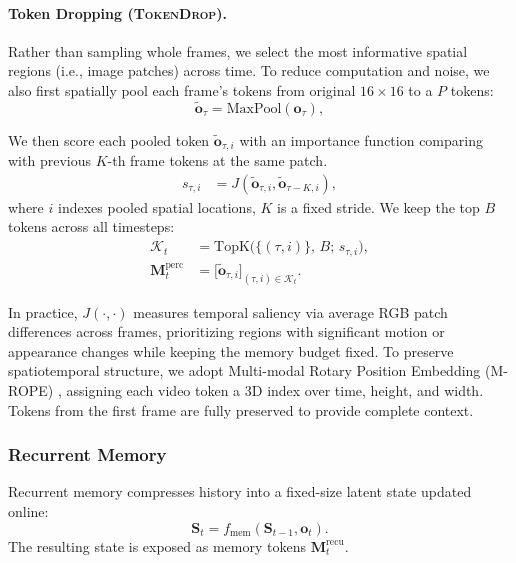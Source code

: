 \paragraph{Token Dropping (\textsc{TokenDrop}).}
Rather than sampling whole frames, we select the most informative spatial regions (i.e., image patches) across time.
To reduce computation and noise, we also first spatially pool each frame's tokens from original $16{\times}16$ to a $P$ tokens:
\[
\tilde{\mathbf{o}}_\tau = \mathrm{MaxPool}(\mathbf{o}_\tau),
\]


We then score each pooled token $\tilde{\mathbf{o}}_{\tau,i}$ with an importance function comparing with previous $K$-th frame tokens at the same patch.
\begin{align}
s_{\tau,i} &= J(\tilde{\mathbf{o}}_{\tau,i}, \tilde{\mathbf{o}}_{\tau-K,i}),
\end{align}
where $i$ indexes pooled spatial locations, $K$ is a fixed stride.
We keep the top $B$ tokens across all timesteps:
\begin{align}
\mathcal{K}_t
&= \mathrm{TopK}\Big(\{(\tau,i)\},\, B;\, s_{\tau,i}\Big),\\
\mathbf{M}_t^{\text{perc}}
&= \big[\tilde{\mathbf{o}}_{\tau,i}\big]_{(\tau,i)\in \mathcal{K}_t}.
\end{align}

In practice, $J(\cdot,\cdot)$ measures temporal saliency via average RGB patch differences across frames, prioritizing regions with significant motion or appearance changes while keeping the memory budget fixed. To preserve spatiotemporal structure, we adopt Multi-modal Rotary Position Embedding (M-ROPE) \cite{yao2025timechat}, assigning each video token a 3D index over time, height, and width. Tokens from the first frame are fully preserved to provide complete context.


\subsubsection{Recurrent Memory}

Recurrent memory compresses history into a fixed-size latent state updated online:
\[
\mathbf{S}_t = f_{\text{mem}}(\mathbf{S}_{t-1}, \mathbf{o}_t).
\]
The resulting state is exposed as memory tokens $\mathbf{M}_t^{\text{recu}}$.

